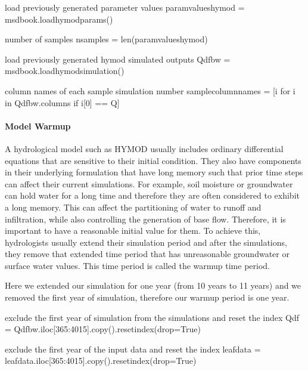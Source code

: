 \documentclass[letterpaper,10pt,english]{book}
\begin{document}
\begin{sphinxVerbatim}[commandchars=\\\{\}]
\PYGZsh{} load previously generated parameter values
param\PYGZus{}values\PYGZus{}hymod = msdbook.load\PYGZus{}hymod\PYGZus{}params()

\PYGZsh{} number of samples
n\PYGZus{}samples = len(param\PYGZus{}values\PYGZus{}hymod)

\PYGZsh{} load previously generated hymod simulated outputs
Q\PYGZus{}df\PYGZus{}bw = msdbook.load\PYGZus{}hymod\PYGZus{}simulation()

\PYGZsh{} column names of each sample simulation number
sample\PYGZus{}column\PYGZus{}names = [i for i in Q\PYGZus{}df\PYGZus{}bw.columns if i[0] == \PYGZsq{}Q\PYGZsq{}]
\end{sphinxVerbatim}


\paragraph{Model Warm\sphinxhyphen{}up}
\label{\detokenize{A2_Jupyter_Notebooks:model-warm-up}}
\sphinxAtStartPar
A hydrological model such as HYMOD usually includes ordinary
differential equations that are sensitive to their initial condition.
They also have components in their underlying formulation that have long
memory such that prior time steps can affect their current simulations.
For example, soil moisture or groundwater can hold water for a long time
and therefore they are often considered to exhibit a long memory. This
can affect the partitioning of water to runoff and infiltration, while
also controlling the generation of base flow. Therefore, it is important
to have a reasonable initial value for them. To achieve this,
hydrologists usually extend their simulation period and after the
simulations, they remove that extended time period that has unreasonable
groundwater or surface water values. This time period is called the
warm\sphinxhyphen{}up time period.

\sphinxAtStartPar
Here we extended our simulation for one year (from 10 years to 11 years)
and we removed the first year of simulation, therefore our warm\sphinxhyphen{}up
period is one year.

\begin{sphinxVerbatim}[commandchars=\\\{\}]
\PYGZsh{} exclude the first year of simulation from the simulations and reset the index
Q\PYGZus{}df = Q\PYGZus{}df\PYGZus{}bw.iloc[365:4015].copy().reset\PYGZus{}index(drop=True)

\PYGZsh{} exclude the first year of the input data and reset the index
leaf\PYGZus{}data = leaf\PYGZus{}data.iloc[365:4015].copy().reset\PYGZus{}index(drop=True)
\end{sphinxVerbatim}
\end{document}
